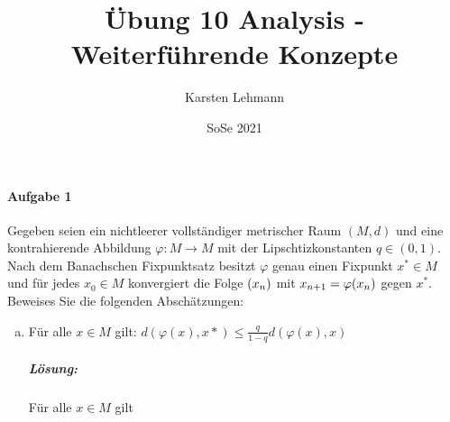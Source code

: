\documentclass{scrreprt}
\author{Karsten Lehmann}
\date{SoSe 2021}
\title{Übung 10 Analysis - Weiterführende Konzepte}
\begin{document}
\paragraph{Aufgabe 1} Gegeben seien ein nichtleerer vollständiger metrischer
Raum $(M, d)$ und eine kontrahierende Abbildung
$\varphi \colon M \to M$ mit der Lipschtizkonstanten $q \in (0, 1)$.
Nach dem Banachschen Fixpunktsatz besitzt $\varphi$ genau einen Fixpunkt
$x^* \in M$ und für jedes $x_0 \in M$ konvergiert die Folge $\qty(x_n)$
mit $x_{n + 1} = \varphi\qty(x_n)$ gegen $x^*$.
Beweises Sie die folgenden Abschätzungen:
\begin{enumerate}[a)]
\item Für alle $x \in M$ gilt: $d(\varphi(x), x*) \leq \frac{q}{1 - q}d(\varphi(x), x)$

  \subparagraph{Lösung:} Für alle $x \in M$ gilt
\end{enumerate}
\end{document}
